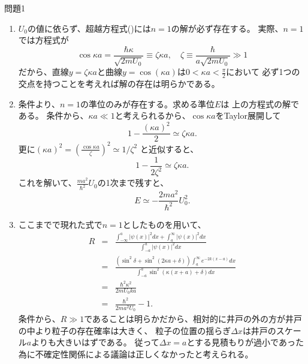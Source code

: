 \documentclass[fleqn]{jbook}
\begin{document}
\begin{answer}{問題1}{}
\begin{enumerate}
\begin{enumerate}
\[  	  	\]
  	  	であるから、これら２式から$\delta$を消去して次の超越方程式を得る；
		\begin{equation}
			\frac{n\pi}{2}=\kappa a + \arcsin \frac{\hbar\kappa}{\sqrt{2mU_0}}.\eqname{Q1_Energy_level}
		\end{equation}
  	  	但し、$0<\arcsin<\frac{\pi}{2}$とする。上の超越方程式の右辺は
  	  	$E$の単調増加関数であるから、$n$の値はエネルギー準位の低い順に一対一対応している。
  	  	特に、正整数$n$の取り得る値は
  	  	\[
  	  		n=1,\cdots,1+\left[\frac{2a\sqrt{2mU_0}}{\pi\hbar}\right]
  	  	\]
  	  	である。($\left[\cdots\right]$はGauss記号である。)
  	  	\item $U_0$の値に依らず、超越方程式()には$n=1$の解が必ず存在する。
  	  	実際、$n=1$では方程式が
  	  	\[
  	  		\cos \kappa a=\frac{\hbar\kappa}{\sqrt{2mU_0}}\equiv \zeta \kappa a,
  	  		\quad
  	  		\zeta \equiv \frac{\hbar}{a\sqrt{2mU_0}}\gg 1 
  	  	\]
  	  	だから、直線$y=\zeta\kappa a$と曲線$y=\cos(\kappa a)$は$0<\kappa a<\frac{\pi}{2}$において
  	  	必ず1つの交点を持つことを考えれば解の存在は明らかである。
  	  	\item 条件より、$n=1$の準位のみが存在する。求める準位$E$は
  	  	上の方程式の解である。
  	  	条件から、$\kappa a\ll 1$と考えられるから、$\cos \kappa a$をTaylor展開して
  	  	\[
  	  		1-\frac{(\kappa a)^2}{2}\simeq \zeta \kappa a.
  	  	\]
  	  	更に$\displaystyle (\kappa a)^2 = \left(\frac{\cos\kappa a}{\zeta}\right)^2 \simeq 1/\zeta^2$
  	  	と近似すると、
  	  	\[
  	  		1-\frac{1}{2\zeta^2} \simeq \zeta \kappa a.
  	  	\]
  	  	これを解いて、$\displaystyle \frac{ma^2}{\hbar^2}U_0$の1次まで残すと、
  	  	\[
  	  		E\simeq -\frac{2ma^2}{\hbar^2}U_0^2.
  	  	\]
  	  	\item ここまでで現れた式で$n=1$としたものを用いて、
  	  	\begin{eqnarray*}
  	  		R&=&\frac{\int_{-\infty}^a|\psi(x)|^2dx+\int_a^\infty |\psi(x)|^2dx}
  	  			{\int_{-a}^a|\psi(x)|^2dx}\\
  	  		&=&\frac{(\sin^2\delta+\sin^2(2\kappa a+\delta))\int_{a}^\infty e^{-2k(x-a)}dx}
  	  			{\int_{-a}^a\sin^2(\kappa (x+a)+\delta)dx}\\
  	  		&=&\frac{\hbar^2\kappa^2}{2mU_0ka}\\
  	  		&=&\frac{\hbar^2}{2ma^2U_0}-1.
  	  	\end{eqnarray*}
  	  	条件から、$R\gg 1$であることは明らかだから、相対的に井戸の外の方が井戸の中より粒子の存在確率は大きく、
  	  	粒子の位置の揺らぎ$\Delta x$は井戸のスケール$a$よりも大きいはずである。
  	  	従って$\Delta x=a$とする見積もりが過小であった為に不確定性関係による議論は正しくなかったと考えられる。
  	\end{enumerate}
\end{enumerate}


\end{answer}
\end{document}
